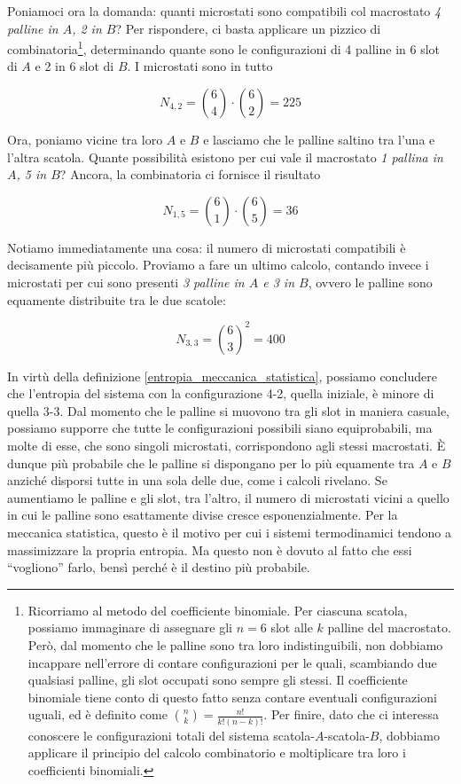 Poniamoci ora la domanda: quanti microstati sono compatibili
col macrostato \textit{4 palline in $A$, 2 in $B$}? Per rispondere,
ci basta applicare un pizzico di combinatoria\footnote{Ricorriamo
al metodo del coefficiente binomiale. Per ciascuna scatola, possiamo immaginare
di assegnare gli $n = 6$ slot alle $k$ palline del macrostato. Però, dal
momento che le palline sono tra loro indistinguibili, non dobbiamo incappare
nell'errore di contare configurazioni per le quali, scambiando due qualsiasi
palline, gli slot occupati sono sempre gli stessi. Il coefficiente binomiale
tiene conto di questo fatto senza contare eventuali configurazioni uguali,
ed è definito come $\binom{n}{k} = \frac{n!}{k!(n - k)!}$. Per finire, dato
che ci interessa conoscere le configurazioni totali del sistema scatola-$A$-scatola-$B$,
dobbiamo applicare il principio del calcolo combinatorio e moltiplicare tra
loro i coefficienti binomiali.},
determinando quante sono le configurazioni di 4 palline in 6 slot di $A$
e 2 in 6 slot di $B$. I microstati sono in tutto

\[ N_{4,2} = \binom{6}{4} \cdot \binom{6}{2} = 225 \]

Ora, poniamo vicine tra loro $A$ e $B$ e lasciamo che le palline
saltino tra l'una e l'altra scatola. Quante possibilità esistono
per cui vale il macrostato \textit{1 pallina in $A$, 5 in $B$}?
Ancora, la combinatoria ci fornisce il risultato

\[ N_{1,5} = \binom{6}{1} \cdot \binom{6}{5} = 36 \]

\noindent Notiamo immediatamente una cosa: il numero di microstati
compatibili è decisamente più piccolo. Proviamo a fare un ultimo
calcolo, contando invece i microstati per cui sono presenti
\textit{3 palline in $A$ e 3 in $B$}, ovvero le palline sono
equamente distribuite tra le due scatole:

\[ N_{3,3} =\binom{6}{3}^2 = 400 \]

In virtù della definizione \ref{entropia_meccanica_statistica}, possiamo concludere che
l'entropia del sistema con la configurazione 4-2, quella iniziale,
è minore di quella 3-3.
Dal momento che le palline si muovono tra gli slot in maniera
casuale, possiamo supporre che tutte le configurazioni possibili
siano equiprobabili, ma molte di esse, che sono singoli microstati,
corrispondono agli stessi macrostati. È dunque più probabile che
le palline si dispongano per lo più equamente tra $A$ e $B$
anziché disporsi tutte in una sola delle due, come i calcoli
rivelano. Se aumentiamo
le palline e gli slot, tra l'altro, il numero di microstati
vicini a quello in cui le palline sono esattamente divise
cresce esponenzialmente. Per la meccanica statistica, questo
è il motivo per cui i sistemi termodinamici tendono a massimizzare
la propria entropia. Ma questo non è dovuto al fatto che essi
``vogliono'' farlo, bensì perché è il destino più probabile.

